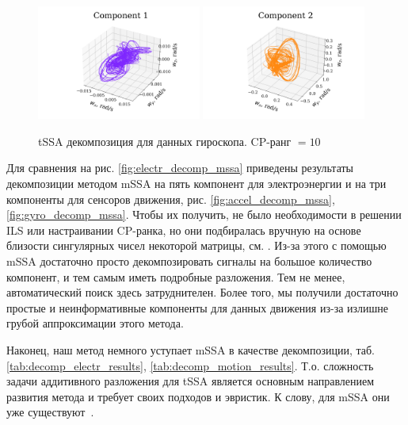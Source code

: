			\begin{figure}[h]
				\centering
				\includegraphics[width=0.48\textwidth, 	keepaspectratio]{../experiments/motion_1/tssa/figs/decomposition/cpd_rank_15/gyro_1.png}
				\includegraphics[width=0.48\textwidth, keepaspectratio]{../experiments/motion_1/tssa/figs/decomposition/cpd_rank_15/gyro_2.png}
				\caption{tSSA декомпозиция для данных гироскопа. CP-ранг $ = 10 $}\label{fig:gyro_decomp_tssa}
			\end{figure}
			
			Для сравнения на рис. \ref{fig:electr_decomp_mssa} приведены результаты декомпозиции методом mSSA на пять компонент для электроэнергии и на три компоненты для сенсоров движения, рис. \ref{fig:accel_decomp_mssa}, \ref{fig:gyro_decomp_mssa}. Чтобы их получить, не было необходимости в решении ILS или настраивании CP-ранка, но они подбиралась вручную на основе близости сингулярных чисел некоторой матрицы, см. \cite{ecfb9dc578be43ae9ee8fc88b8ff9151}. Из-за этого с помощью mSSA достаточно просто декомпозировать сигналы на большое количество компонент, и тем самым иметь подробные разложения. Тем не менее, автоматический поиск здесь затруднителен. Более того, мы получили достаточно простые и неинформативные компоненты для данных движения из-за излишне грубой аппроксимации этого метода. 
			
			Наконец, наш метод немного уступает mSSA в качестве декомпозиции, таб. \ref{tab:decomp_electr_results}, \ref{tab:decomp_motion_results}. Т.о. сложность задачи аддитивного разложения для tSSA является основным направлением развития метода и требует своих подходов и эвристик. К слову, для mSSA они уже существуют~\cite{ecfb9dc578be43ae9ee8fc88b8ff9151}.
			
